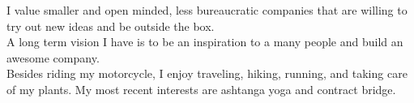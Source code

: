 \documentclass[9pt]{template} %
\begin{document}
\vspace{0.5cm}



\begin{minipage}[t]{0.4\textwidth} %
  \vspace{-\baselineskip} %
  I value smaller and open minded, less bureaucratic companies that are willing to try out new ideas and be outside the box.\\

  A long term vision I have is to be an inspiration to a many people and build an awesome company.\\

  Besides riding my motorcycle, I enjoy traveling, hiking, running, and taking care of my plants. My most recent interests are ashtanga yoga and contract bridge.
\end{minipage}
\hfill %
\begin{minipage}[t]{0.5\textwidth} %
  \vspace{-\baselineskip} %
  \begin{barchart}{5.0}
  \end{barchart}
\end{minipage}



\end{document}
